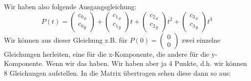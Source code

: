 Wir haben also folgende Ausgangsgleichung:
\begin{displaymath}
P(t) = \begin{pmatrix} {c_0}_x \\ {c_0}_y \end{pmatrix} + \begin{pmatrix} {c_1}_x \\ {c_1}_y \end{pmatrix} t+ \begin{pmatrix} {c_2}_x \\ {c_2}_y \end{pmatrix} t^2+ \begin{pmatrix} {c_3}_x \\ {c_3}_y \end{pmatrix} t^3
\end{displaymath}
Wir können aus dieser Gleichung z.B. für \(P(0) = \begin{pmatrix} 0 \\ 0 \end{pmatrix}\) zwei einzelne Gleichungen herleiten, eine für die x-Komponente, die andere für die y-Komponente. Wenn wir das haben. Wir haben aber ja 4 Punkte, d.h. wir können 8 Gleichungen aufstellen. In die Matrix übertragen sehen diese dann so aus:

